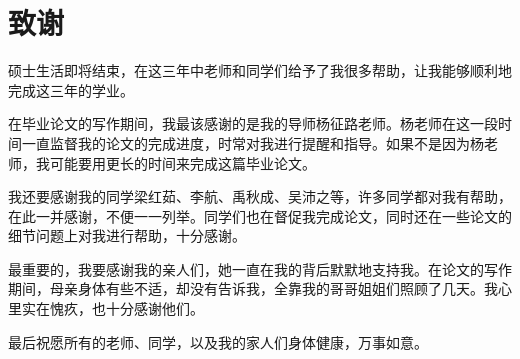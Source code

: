 
\chapter*{致谢}
硕士生活即将结束，在这三年中老师和同学们给予了我很多帮助，让我能够顺利地完成这三年的学业。\par
在毕业论文的写作期间，我最该感谢的是我的导师杨征路老师。杨老师在这一段时间一直监督我的论文的完成进度，时常对我进行提醒和指导。如果不是因为杨老师，我可能要用更长的时间来完成这篇毕业论文。\par
我还要感谢我的同学梁红茹、李航、禹秋成、吴沛之等，许多同学都对我有帮助，在此一并感谢，不便一一列举。同学们也在督促我完成论文，同时还在一些论文的细节问题上对我进行帮助，十分感谢。\par
最重要的，我要感谢我的亲人们，她一直在我的背后默默地支持我。在论文的写作期间，母亲身体有些不适，却没有告诉我，全靠我的哥哥姐姐们照顾了几天。我心里实在愧疚，也十分感谢他们。\par
最后祝愿所有的老师、同学，以及我的家人们身体健康，万事如意。
